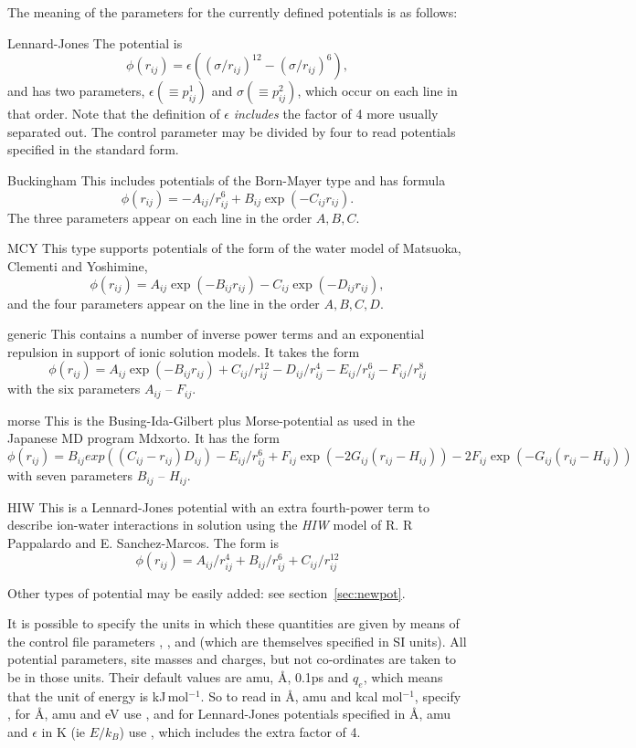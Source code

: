 \documentclass[a4paper,twoside]{report}
\begin{document}
The meaning of the parameters for the currently defined potentials is
as follows:
\begin{Litdescription}
\item[Lennard-Jones] The potential is 
\[\phi(r_{ij}) = \epsilon((\sigma/r_{ij})^{12} -
(\sigma/r_{ij})^{6}),\] and has two parameters, $\epsilon ( \equiv p^{1}_{ij})$
and $\sigma ( \equiv p^{2}_{ij})$, which occur on each line in that
order.  Note that the definition of $\epsilon$ \emph{includes} the
factor of 4 more usually separated out.  The control parameter
 may be divided by four to read potentials
specified in the standard form.

\item[Buckingham] This includes potentials of the Born-Mayer type and
has formula \[\phi(r_{ij}) = -A_{ij}/r^{6}_{ij} + B_{ij}\exp(-C_{ij}r_{ij}).\]
The three parameters appear on each line in the order $A, B, C$.
\item[MCY] This type supports potentials of the form of the water
model of Matsuoka, Clementi and Yoshimine\cite{matsuoka:75}, 
\[\phi(r_{ij}) = A_{ij}\exp(-B_{ij}r_{ij}) - C_{ij}\exp(-D_{ij}r_{ij}),\]
and the four parameters appear on the line in the order $A, B, C, D$.
\item[generic] This contains a number of inverse power terms and
  an exponential repulsion in support of ionic solution models.
  It takes the form
\[\phi(r_{ij}) = A_{ij} \exp(-B_{ij}r_{ij}) + C_{ij}/r_{ij}^{12} -
  D_{ij}/r_{ij}^4 -E_{ij}/r_{ij}^6 -F_{ij}/r_{ij}^8\]
with the six parameters $A_{ij}$ -- $F_{ij}$.
\item[morse] This is the Busing-Ida-Gilbert plus Morse-potential as
  used in the Japanese MD program Mdxorto.  It has the form
\[\phi(r_{ij}) = B_{ij}  exp ((C_{ij}-r_{ij})D_{ij})   - E_{ij}/r_{ij}^6 + F_{ij} \exp (-2G_{ij}(r_{ij}-H_{ij})) - 2F_{ij}\exp (-G_{ij}(r_{ij}-H_{ij}))\]
with seven parameters $B_{ij}$ -- $H_{ij}$.
\item[HIW]  This is a Lennard-Jones potential with an extra
  fourth-power term to describe ion-water interactions in solution
  using the \emph{HIW} model of R. R Pappalardo and
  E. Sanchez-Marcos\cite{pappalardo:93}.  The form is
\[\phi(r_{ij}) =  A_{ij}/r_{ij}^4 + B_{ij}/r_{ij}^6 + C_{ij}/r_{ij}^{12}\]
\end{Litdescription}
\noindent
Other types of potential may be easily added: see section~\ref{sec:newpot}.

It is possible to specify the units in which these quantities are
given by means of the control file parameters ,
,  and  (which are
themselves specified in SI units). All potential parameters, site
masses and charges, but not co-ordinates are taken to be in those
units. Their default values are amu, {\AA}, 0.1ps and $q_{e}$, which means
that the unit of energy is kJ\,mol$^{-1}$.  So to read in {\AA}, amu and
kcal mol$^{-1}$, specify , for  {\AA}, amu
and eV use , and for Lennard-Jones
potentials specified in  {\AA}, amu and $\epsilon$ in K (ie  $E/k_B$) use
, which includes the extra factor of 4.
\end{document}
